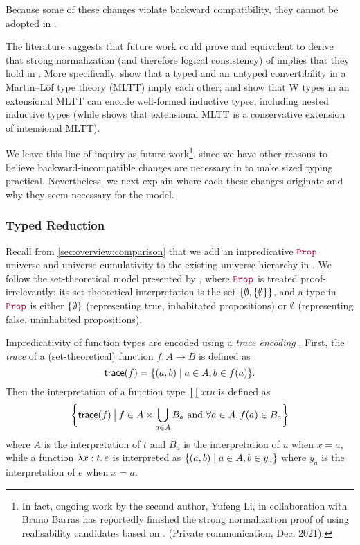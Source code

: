 Because some of these changes violate backward compatibility, they cannot be
adopted in \lang.

The literature suggests that future work could prove \langAnother and \lang
equivalent to derive that strong normalization (and therefore logical
consistency) of \langAnother implies that they hold in \lang.
More specifically, \cite{conversion} show that a typed and an untyped convertibility in a Martin--L\"of type theory (MLTT) imply each other;
and \citet{w-types, polynomial-functors-w} show that W types in an extensional MLTT
can encode well-formed inductive types, including nested inductive types
(while \citet{hofmann} shows that extensional MLTT is a conservative extension of intensional MLTT).

We leave this line of inquiry as future work\footnote{In fact, ongoing work by
  the second author, Yufeng Li, in collaboration with Bruno Barras has reportedly
  finished the strong normalization proof of \langAnother using realisability
  candidates based on \citet{barras-thesis}. (Private
  communication, Dec. 2021).}, since we have other reasons to believe backward-incompatible
  changes are necessary in \lang to make sized typing practical.
Nevertheless, we next explain where each these changes originate and why they
seem necessary for the model.

\subsubsection{Typed Reduction}

Recall from \autoref{sec:overview:comparison} that we add an impredicative $\Prop$ universe
and universe cumulativity to the existing universe hierarchy in \CIChatminus.
We follow the set-theoretical model presented by \citet{not-so-simple-cc},
where $\Prop$ is treated proof-irrelevantly:
its set-theoretical interpretation is the set $\{\emptyset, \{\emptyset\}\}$,
and a type in $\Prop$ is either $\{\emptyset\}$ (representing true, inhabitated propositions)
or $\emptyset$ (representing false, uninhabited propositions).

Impredicativity of function types are encoded using a \emph{trace encoding} \citep{aczel-trace}.
First, the \emph{trace} of a (set-theoretical) function $f : A \to B$ is defined as
$$\textsf{trace}(f) = \{(a, b) \mid a \in A, b \in f(a)\}.$$
Then the interpretation of a function type $\prod{x}{t}{u}$ is defined as
$$\bigg\{\textsf{trace}(f) \mathbin{\big|} f \in A \times \bigcup_{a \in A} B_a \text{ and } \forall a \in A, f(a) \in B_a\bigg\}$$
where $A$ is the interpretation of $t$ and $B_a$ is the interpretation of $u$ when $x = a$,
while a function $\lambda x : t \mathpunct{.} e$ is interpreted as
$\{(a, b) \mid a \in A, b \in y_a\}$
where $y_a$ is the interpretation of $e$ when $x = a$.

